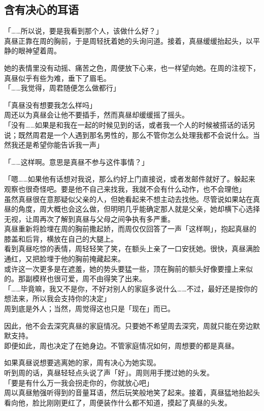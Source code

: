 \subsection{含有决心的耳语}

「……所以说，要是我看到那个人，该做什么好？」\\

真昼正靠在周的胸前，于是周轻抚着她的头询问道。接着，真昼缓缓抬起头，以平静的眼神望着周。

她的表情里没有动摇、痛苦之色，周便放下心来，也一样望向她。在周的注视下，真昼似乎有些为难，垂下了眉毛。\\

「……我觉得，周君随便怎么做都行」

「真昼没有想要我怎么样吗」\\

周还以为真昼会让他不要插手，然而真昼却缓缓摇了摇头。\\

「没有……如果是和我在一起的时候见到的话，或者我一个人的时候被搭话的话另说；既然周君是一个人遇到那名男性的，那么不管你怎么处理我都不会说什么。当然我还是希望你能告诉我一声」

「……这样啊。意思是真昼不参与这件事情？」

「嗯……如果他有话想对我说，那么约好上门直接说，或者发邮件就好了。躲起来观察也很奇怪吧。要是他不自己来找我，我就不会有什么动作，也不会理他」\\

虽然真昼很在意那疑似父亲的人，但她看起来不想主动去找他。尽管说如果站在真昼的角度，周大概也会这么做，但明明几乎能确定那人就是父亲，她却横下心选择无视，让周再次了解到真昼与父母之间争执有多严重。\\

真昼重新将脸埋在周的胸前撒起娇，而周仅仅回答了一声「这样啊」，抱起真昼的膝盖和后背，横放在自己的大腿上。\\

看到真昼吃惊的表情，周轻轻笑了笑，在额头上亲了一口安抚她。很快，真昼满脸通红，又把脸埋于他的胸前掩藏起来。\\

或许这一次更多是在遮羞，她的势头要猛一些，顶在胸前的额头好像要撞上来似的。那副模样也很可爱，周不由得笑了出来。\\

「……毕竟嘛，我又不是你，不好对别人的家庭多说什么……不过，最好还是按你的想法来，所以我会支持你的决定」\\

周到底是外人；当然，周觉得这也只是「现在」而已。

因此，他不会去深究真昼的家庭情况。只要她不希望周去深究，周就只能在旁边默默支持。\\

即便如此，周也决定了在她身边。不管家庭情况如何，周想要的都是真昼。

如果真昼说想要逃离她的家，周有决心为她实现。\\

听到周的话，真昼轻轻点头说了声「好」。周则用手搅过她的头发。\\

「要是有什么万一我会拐走你的，你就放心吧」\\

周以真昼勉强听得到的音量耳语，然后玩笑般地笑了起来。接着，真昼猛地抬起头看向他，脸比刚刚更红了，周便装作什么都不知道，摸起了真昼的头发。
